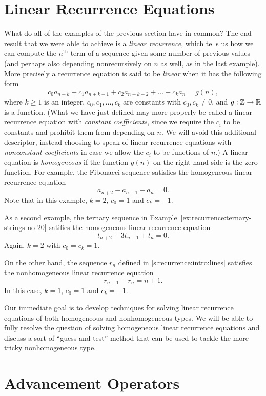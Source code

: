 \section{Linear Recurrence Equations}\label{s:recurrence:linear}

What do all of the examples of the previous section have in common?
The end result that we were able to achieve is a \emph{linear
  recurrence}, which tells us how we can compute the $n^\text{th}$
term of a sequence given some number of previous values (and perhaps
also depending nonrecursively on $n$ as well, as in the last example).
More precisely a recurrence equation is said to be \textit{linear}
when it has the following form
\[
c_0a_{n+k}+ c_1a_{n+k-1} + c_2a_{n+k-2} + \dots+c_ka_{n} = g(n),
\] 
where $k\ge1$ is an integer, $c_0,c_1,\dots,c_k$ are constants with
$c_0,c_k\neq0$, and
$g:\mathbb{Z}\rightarrow\mathbb{R}$ is a function. (What we have just defined
may more properly be called a linear recurrence equation with
\emph{constant coefficients}, since we require the $c_i$ to be
constants and prohibit them from depending on $n$. We will avoid this
additional descriptor, instead choosing to speak of linear recurrence
equations with \emph{nonconstant coefficients} in case we allow the
$c_i$ to be functions of $n$.) A linear equation is
\textit{homogeneous} if the function $g(n)$ on the right hand side
is the zero function.  For example, the Fibonacci sequence satisfies
the homogeneous linear recurrence equation
\[
a_{n+2} - a_{n+1} - a_n = 0.
\]
Note that in this example, $k=2$, $c_0=1$ and $c_k=-1$.

As a second example, the ternary sequence in
\hyperref[ex:recurrence:ternary-strings-no-20]{Example~\ref*{ex:recurrence:ternary-strings-no-20}}
  satifies the  homogeneous linear recurrence equation
\[
t_{n+2} - 3t_{n+1} + t_n = 0.
\]
Again, $k=2$ with $c_0=c_k=1$.

On the other hand, the sequence $r_n$ defined in
\autoref{s:recurrence:intro:lines} satisfies the nonhomogeneous
linear recurrence equation
\[
r_{n+1} - r_{n} = n+1.
\]
In this case, $k=1$, $c_0=1$ and $c_k=-1$.

Our immediate goal is to develop techniques for solving linear
recurrence equations of both homogeneous and nonhomogeneous types. We
will be able to fully resolve the question of solving homogeneous
linear recurrence equations and discuss a sort of ``guess-and-test''
method that can be used to tackle the more tricky nonhomogeneous type.

\section{Advancement Operators}\label{s:recurrence:adv-ops}

